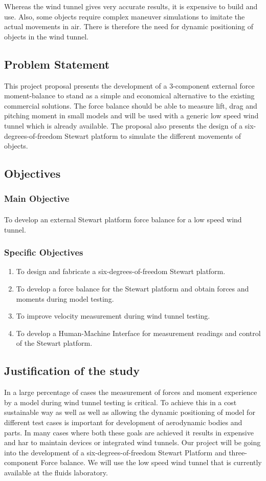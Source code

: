 Whereas the wind tunnel gives very accurate results, it is expensive to build and use. Also, some objects require complex maneuver simulations to imitate the actual movements in air. There is therefore the need for dynamic positioning of objects in the wind tunnel.

\subsection{Problem Statement}This project proposal presents the development of a 3-component external force moment-balance to stand as a simple and economical alternative to the existing commercial solutions. The force balance should be able to measure lift, drag and pitching moment in small models and will be used with a generic low speed wind tunnel which is already available. The proposal also presents the design of a six-degrees-of-freedom Stewart platform to simulate the different movements of objects.
\subsection{Objectives}
\subsubsection{Main Objective}
\paragraph{} To develop an external Stewart platform force balance for a low speed wind tunnel. 
\subsubsection{Specific Objectives}
\begin{enumerate}
\item To design and fabricate a six-degrees-of-freedom Stewart platform.
\item To develop a force balance for the Stewart platform and obtain forces and moments during model testing.
\item To improve velocity measurement during wind tunnel testing.
\item To develop a Human-Machine Interface for measurement readings and control of the Stewart platform.
\end{enumerate}
\subsection{Justification of the study}
In a large percentage of cases the measurement of forces and moment experience by a model during wind tunnel testing is critical. To achieve this in a cost sustainable way as well as well as allowing the dynamic positioning of model for different test cases is important for development of aerodynamic bodies and parts. In many cases where both these goals are achieved it results in expensive and har to maintain devices or integrated wind tunnels. Our project will be going into the development of a six-degrees-of-freedom Stewart Platform and three-component Force balance. We will use the low speed wind tunnel that is currently available at the fluids laboratory.
